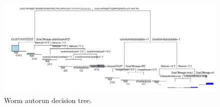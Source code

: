 \begin{figure}[h!]
\centering
\includegraphics[width=1\textwidth]{graph/decisiontreeworm.jpg}
\caption{Worm autorun decision tree.}
\label{fig:decisiontreeworm}
\end{figure}
